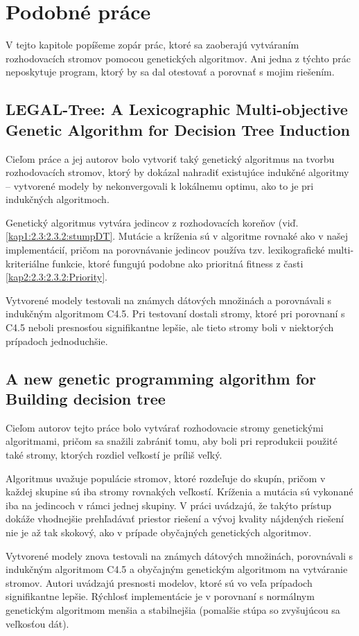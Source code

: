 \chapter{Podobné práce}\label{kap6:SimilarWorks}
V tejto kapitole popíšeme zopár prác, ktoré sa zaoberajú vytváraním rozhodovacích stromov pomocou genetických algoritmov. Ani jedna z týchto prác neposkytuje program, ktorý by sa dal otestovať a porovnať s mojim riešením.

\section{LEGAL-Tree: A Lexicographic Multi-objective Genetic Algorithm for Decision Tree Induction}\label{kap6: 6.1:Legal}
Cieľom práce a jej autorov \cite{kap6-legal} bolo vytvoriť taký genetický algoritmus na tvorbu rozhodovacích stromov, ktorý by dokázal nahradiť existujúce indukčné algoritmy -- vytvorené modely by nekonvergovali k lokálnemu optimu, ako to je pri indukčných algoritmoch. 

Genetický algoritmus vytvára jedincov z rozhodovacích koreňov (viď. \ref{kap1:2.3:2.3.2:stumpDT}. Mutácie a kríženia sú v algoritme rovnaké ako v našej implementácií, pričom na porovnávanie jedincov používa tzv. lexikografické multi-kriteriálne funkcie, ktoré fungujú podobne ako prioritná fitness z časti \ref{kap2:2.3:2.3.2:Priority}.

Vytvorené modely testovali na známych dátových množinách a porovnávali s indukčným algoritmom C4.5. Pri testovaní dostali stromy, ktoré pri porovnaní s C4.5 neboli presnosťou signifikantne lepšie, ale tieto stromy boli v niektorých prípadoch jednoduchšie.

\section{A new genetic programming algorithm for Building decision tree}\label{kap6:6.2:Hybrid}
Cieľom autorov \cite{kap6-group} tejto práce bolo vytvárať rozhodovacie stromy genetickými algoritmami, pričom sa snažili zabrániť tomu, aby boli pri reprodukcii použité také stromy, ktorých rozdiel veľkostí je príliš veľký. 

Algoritmus uvažuje populácie stromov, ktoré rozdeľuje do skupín, pričom v každej skupine sú iba stromy rovnakých veľkostí. Kríženia a mutácia sú vykonané iba na jedincoch v rámci jednej skupiny. V práci uvádzajú, že takýto prístup dokáže vhodnejšie prehľadávať priestor riešení a vývoj kvality nájdených riešení nie je až tak skokový, ako v prípade obyčajných genetických algoritmov.

Vytvorené modely znova testovali na známych dátových množinách, porovnávali s indukčným algoritmom C4.5 a obyčajným genetickým algoritmom na vytváranie stromov. Autori uvádzajú presnosti modelov, ktoré sú vo veľa prípadoch signifikantne lepšie. Rýchlosť implementácie je v porovnaní s normálnym genetickým algoritmom menšia a stabilnejšia (pomalšie stúpa so zvyšujúcou sa veľkosťou dát).

